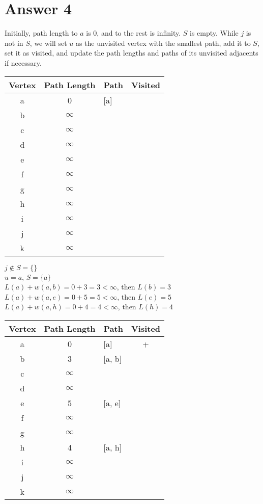 \documentclass[12pt]{article}
\begin{document}
\section*{Answer 4}
Initially, path length to $a$ is 0, and to the rest is infinity. $S$ is empty. While $j$ is not in $S$, we will set $u$ as the unvisited vertex with the smallest path, add it to $S$, set it as visited, and update the path lengths and paths of its unvisited adjacents if necessary.

\begin{center}
\begin{tabular}{c|c|l|c}
    Vertex & Path Length & Path & Visited \\
    \hline
    a & 0 & [a] & \\
    b & $\infty$ & & \\
    c & $\infty$ & & \\
    d & $\infty$ & & \\
    e & $\infty$ & & \\
    f & $\infty$ & & \\
    g & $\infty$ & & \\
    h & $\infty$ & & \\
    i & $\infty$ & & \\
    j & $\infty$ & & \\
    k & $\infty$ & &
\end{tabular}
\end{center}

$j \notin S = \{\}$ \\
$u = a$, $S = \{a\}$ \\
$L(a) + w(a, b) = 0 + 3 = 3 < \infty$, then $L(b) = 3$ \\
$L(a) + w(a, e) = 0 + 5 = 5 < \infty$, then $L(e) = 5$ \\
$L(a) + w(a, h) = 0 + 4 = 4 < \infty$, then $L(h) = 4$ \\

\begin{center}
\begin{tabular}{c|c|l|c}
    Vertex & Path Length & Path & Visited \\
    \hline
    a & 0 & [a] & + \\
    b & 3 & [a, b] & \\
    c & $\infty$ & & \\
    d & $\infty$ & & \\
    e & 5 & [a, e] & \\
    f & $\infty$ & & \\
    g & $\infty$ & & \\
    h & 4 & [a, h] & \\
    i & $\infty$ & & \\
    j & $\infty$ & & \\
    k & $\infty$ & &
\end{tabular}
\end{center}
\end{document}
